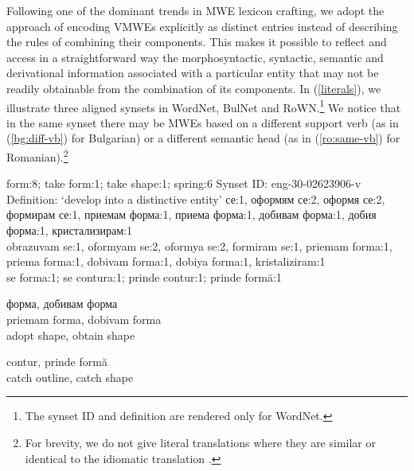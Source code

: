 \documentclass[output=paper,colorlinks,citecolor=brown]{langscibook}
\begin{document}
Following one of the dominant trends in MWE lexicon crafting, we adopt the approach of encoding VMWEs explicitly as distinct entries instead of describing the rules of combining their components. This makes it possible to reflect and access in a straightforward way the morphosyntactic, syntactic, semantic and derivational information associated with a particular entity that may not be readily obtainable from the combination of its components. %
In (\ref{literals}), we illustrate three aligned synsets in WordNet, BulNet and RoWN.\footnote{The synset ID and definition are rendered only for WordNet.} We notice that in the same synset there may be MWEs based on a different support verb (as in (\ref{bg:diff-vb}) for Bulgarian) or a different semantic head (as in (\ref{ro:same-vb}) for Romanian).\footnote{For brevity, we do not give literal translations where they are similar or identical to the idiomatic translation%
.}


\begin{exe}
 \ex \label{literals}
 \begin{xlist}
\ex \label{en:takeform}
\settowidth {}
 form:8; {take form}:1; {take shape}:1; spring:6
Synset ID: eng-30-02623906-v 
\glt Definition: `develop into a distinctive entity'%
\ex \label{bg:priemamforma0}
 \settowidth {} 
    {се}:1, {оформям} {се}:2, {оформя} {се}:2, {формирам} {се}:1, {приемам} {форма}:1, {приема} {форма}:1, {добивам} {форма}:1, {добия} {форма}:1, {кристализирам}:1   \\
    obrazuvam se:1, oformyam se:2, oformya se:2, formiram se:1, priemam forma:1, priema forma:1,   dobivam forma:1, dobiya forma:1, kristaliziram:1 
     \\      
\ex \label{ro:prindecontur}
 \settowidth {}
  {se} {forma}:1; {se} {contura}:1; {prinde} {contur}:1; {prinde} {formă}:1    
 \end{xlist}
\end{exe}

\begin{exe}
\ex 
\begin{xlist}
    \ex \label{bg:diff-vb}
    \settowidth {}  
     {форма}, {добивам} {форма} \\ 
           priemam forma, dobivam forma \\ 
           adopt shape, obtain shape \\ 
     
    
     \ex \label{ro:same-vb}
    \settowidth {}
     {contur},  {prinde} {formă} \\ 
         catch outline,  catch shape \\ 
\end{xlist}
\end{exe}
\end{document}
